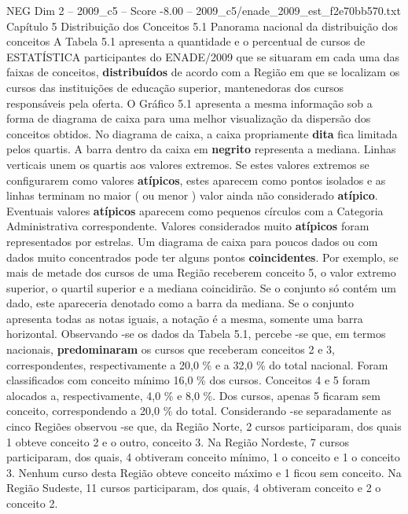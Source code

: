 \begin{textsample}{NEG Dim 2 – 2009\_c5 – Score -8.00 – 2009\_c5/enade\_2009\_est\_f2e70bb570.txt}  \label{ex:f2_neg_011}
Capítulo 5 Distribuição dos Conceitos 5.1 Panorama nacional da distribuição dos conceitos A Tabela 5.1 apresenta a quantidade e o percentual de cursos de ESTATÍSTICA participantes do ENADE/2009 que se situaram em cada uma das faixas de conceitos, \textbf{distribuídos} de acordo com a Região em que se localizam os cursos das instituições de educação superior, mantenedoras dos cursos responsáveis pela oferta.
O Gráfico 5.1 apresenta a mesma informação sob a forma de diagrama de caixa para uma melhor visualização da dispersão dos conceitos obtidos.
No diagrama de caixa, a caixa propriamente \textbf{dita} fica limitada pelos quartis.
A barra dentro da caixa em \textbf{negrito} representa a mediana.
Linhas verticais unem os quartis aos valores extremos.
Se estes valores extremos se configurarem como valores \textbf{atípicos}, estes aparecem como pontos isolados e as linhas terminam no maior ( ou menor ) valor ainda não considerado \textbf{atípico}.
Eventuais valores \textbf{atípicos} aparecem como pequenos círculos com a Categoria Administrativa correspondente.
Valores considerados muito \textbf{atípicos} foram representados por estrelas.
Um diagrama de caixa para poucos dados ou com dados muito concentrados pode ter alguns pontos \textbf{coincidentes}.
Por exemplo, se mais de metade dos cursos de uma Região receberem conceito 5, o valor extremo superior, o quartil superior e a mediana coincidirão.
Se o conjunto só contém um dado, este apareceria denotado como a barra da mediana.
Se o conjunto apresenta todas as notas iguais, a notação é a mesma, somente uma barra horizontal.
Observando -se os dados da Tabela 5.1, percebe -se que, em termos nacionais, \textbf{predominaram} os cursos que receberam conceitos 2 e 3, correspondentes, respectivamente a 20,0 \% e a 32,0 \% do total nacional.
Foram classificados com conceito mínimo 16,0 \% dos cursos.
Conceitos 4 e 5 foram alocados a, respectivamente, 4,0 \% e 8,0 \%.
Dos cursos, apenas 5 ficaram sem conceito, correspondendo a 20,0 \% do total.
Considerando -se separadamente as cinco Regiões observou -se que, da Região Norte, 2 cursos participaram, dos quais 1 obteve conceito 2 e o outro, conceito 3.
Na Região Nordeste, 7 cursos participaram, dos quais, 4 obtiveram conceito mínimo, 1 o conceito e 1 o conceito 3.
Nenhum curso desta Região obteve conceito máximo e 1 ficou sem conceito.
Na Região Sudeste, 11 cursos participaram, dos quais, 4 obtiveram conceito e 2 o conceito 2.

\end{textsample}

